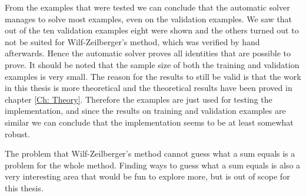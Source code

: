 From the examples that were tested we can conclude that the automatic solver manages to solve most examples, even on the validation examples. We saw that out of the ten validation examples eight were shown and the others turned out to not be suited for Wilf-Zeilberger's method, which was verified by hand afterwards. Hence the automatic solver proves all identities that are possible to prove. It should be noted that the sample size of both the training and validation examples is very small. The reason for the results to still be valid is that the work in this thesis is more theoretical and the theoretical results have been proved in chapter \ref{Ch: Theory}. Therefore the examples are just used for testing the implementation, and since the results on training and validation examples are similar we can conclude that the implementation seems to be at least somewhat robust.

The problem that Wilf-Zeilberger's method cannot guess what a sum equals is a problem for the whole method. Finding ways to guess what a sum equals is also a very interesting area that would be fun to explore more, but is out of scope for this thesis. 
